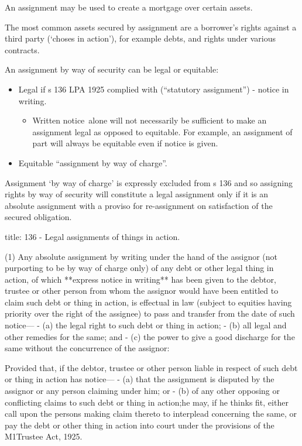 \documentclass[
]{article}
\newenvironment{Shaded}{}{}
\newcommand{\NormalTok}[1]{#1}
\providecommand{\tightlist}{%
  \setlength{\itemsep}{0pt}\setlength{\parskip}{0pt}}
\begin{document}
An assignment may be used to create a mortgage over certain assets.

The most common assets secured by assignment are a borrower's rights
against a third party (`choses in action'), for example debts, and
rights under various contracts.

An assignment by way of security can be legal or equitable:

\begin{itemize}
\tightlist
\item
  Legal if s 136 LPA 1925 complied with (``statutory assignment'') -
  notice in writing.

  \begin{itemize}
  \tightlist
  \item
    Written notice~alone will not necessarily be sufficient to make an
    assignment legal as opposed to equitable. For example, an assignment
    of part will always be equitable even if notice is given.
  \end{itemize}
\item
  Equitable ``assignment by way of charge''.
\end{itemize}

Assignment `by way of charge' is expressly excluded from s 136 and so
assigning rights by way of security will constitute a legal assignment
only if it is an absolute assignment with a proviso for re-assignment on
satisfaction of the secured obligation.

\begin{Shaded}
\begin{Highlighting}[]
\NormalTok{title: 136 {-} Legal assignments of things in action.}

\NormalTok{(1) Any absolute assignment by writing under the hand of the assignor (not purporting to be by way of charge only) of any debt or other legal thing in action, of which **express notice in writing** has been given to the debtor, trustee or other person from whom the assignor would have been entitled to claim such debt or thing in action, is effectual in law (subject to equities having priority over the right of the assignee) to pass and transfer from the date of such notice—}
\NormalTok{{-} (a) the legal right to such debt or thing in action;}
\NormalTok{{-} (b) all legal and other remedies for the same; and}
\NormalTok{{-} (c) the power to give a good discharge for the same without the concurrence of the assignor:}

\NormalTok{Provided that, if the debtor, trustee or other person liable in respect of such debt or thing in action has notice—}
\NormalTok{{-} (a) that the assignment is disputed by the assignor or any person claiming under him; or}
\NormalTok{{-} (b) of any other opposing or conflicting claims to such debt or thing in action;he may, if he thinks fit, either call upon the persons making claim thereto to interplead concerning the same, or pay the debt or other thing in action into court under the provisions of the M1Trustee Act, 1925.}
\end{Highlighting}
\end{Shaded}
\end{document}
